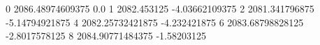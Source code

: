 0 2086.48974609375 0.0
1 2082.453125 -4.03662109375
2 2081.341796875 -5.14794921875
4 2082.25732421875 -4.232421875
6 2083.68798828125 -2.8017578125
8 2084.90771484375 -1.58203125
